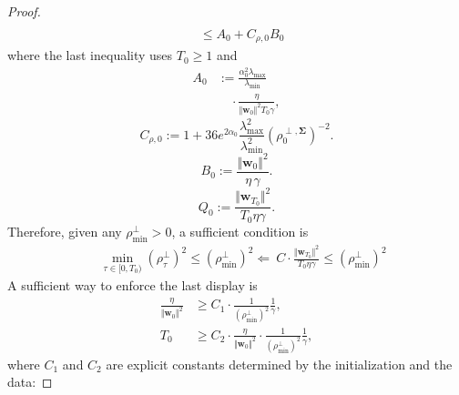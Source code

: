 \documentclass[pdflatex,sn-basic]{sn-jnl}%
\theoremstyle{thmstyleone}%
\begin{document}
\begin{appendices}
\begin{proof}
\begin{equation*}
\begin{aligned}
    \\ & \le A_0 + C_{\rho,0} B_0
  \end{aligned}
  \end{equation*}
  where the last inequality uses $T_0 \ge 1$ and
  \begin{equation*}
  \begin{aligned}
    A_0
    & :=
    \frac{\alpha_{0}^2 \lambda_{\max}}{\lambda_{\min}}
    \\ & \quad \cdot
    \frac{\eta}{\Vert \mathbf{w}_{0} \Vert^2 T_0 \gamma},
  \end{aligned}
  \end{equation*}
  \begin{equation*}
    C_{\rho,0}
    :=
    1
    +
    36 e^{2\alpha_0}
    \frac{\lambda_{\max}^2}{\lambda_{\min}^2}
    \left(
      \rho_0^{\perp, \mathbf{\Sigma}}
    \right)^{-2}.
  \end{equation*}
  \begin{equation*}
    B_0
    :=
    \frac{\Vert \mathbf{w}_{0} \Vert^2}{\eta\,\gamma}.
  \end{equation*}
  \begin{equation*}
    Q_0
    :=
    \frac{\Vert \mathbf{w}_{T_0} \Vert^2}{T_0 \eta \gamma}.
  \end{equation*}
  Therefore, given any $\rho_{\min}^{\perp} > 0$, a sufficient condition is
  \begin{equation*}
  \begin{aligned}
    & \ \min_{\tau \in [0, T_0)} 
    \left(
      \rho_{\tau}^{\perp}
    \right)^2 
     \le
    \left(
      \rho_{\min}^{\perp}
    \right)^2 
    \boldsymbol{\Leftarrow} \ 
    C \cdot 
    \frac{\Vert \mathbf{w}_{T_0} \Vert^2}{T_0 \eta \gamma} 
    \le
    \left(
      \rho_{\min}^{\perp}
    \right)^2
  \end{aligned}
  \end{equation*}
  A sufficient way to enforce the last display is
  \begin{equation*}
  \begin{aligned}
    \frac{\eta}{\Vert \mathbf{w}_0 \Vert^2}
    & \ge C_1 \cdot \frac{1}{ \left(\rho_{\min}^{\perp}\right)^2 }
    \frac{1}{\gamma},
    \\
    T_0
    & \ge C_2 \cdot \frac{\eta}{\Vert \mathbf{w}_0 \Vert^2} \cdot \frac{1}{ \left(\rho_{\min}^{\perp}\right)^2 } 
    \frac{1}{\gamma},
  \end{aligned}
  \end{equation*}
  where $C_1$ and $C_2$ are explicit constants determined by the initialization and the data:

\end{proof}
\end{appendices}
\end{document}
